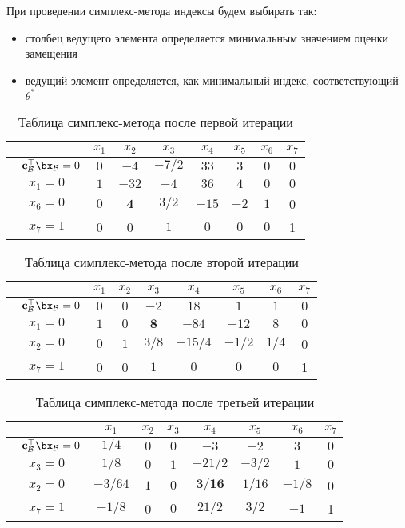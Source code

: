\documentclass[12pt]{article}
\begin{document}
При проведении симплекс-метода индексы будем выбирать так:
\begin{itemize}
\item столбец ведущего элемента определяется минимальным значением оценки замещения
\item ведущий элемент определяется, как минимальный индекс, соответствующий $\theta^*$
\end{itemize}

\newpage

\begin{table}[!ht]
\centering
\caption{Таблица симплекс-метода после первой итерации}
\begin{tabular}{|c|ccccccc|}
\hline
& $x_1$ & $x_2$ & $x_3$ & $x_4$ & $x_5$ & $x_6$ & $x_7$\\
\hline
$-\mathbf{c}_{\mathcal{B}}^{\top}\bx_{\mathcal{B}} = 0$ & $0$ & $-4$ & $-7/2$ & $33$ & $3$ & $0$ & $0$ \\
\hline
$x_1 = 0$ & $1$ & $-32$ & $-4$ & $36$ & $4$ & $0$ & $0$ \\
$x_6 = 0$ & $0$ & $\mathbf{4}$ & $3/2$ & $-15$ & $-2$ & $1$ & 0 \\
$x_7 = 1$ & 0 & 0 & $1$ & $0$ & $0$ & $0$ & 1 \\
\hline
\end{tabular}
\label{tab::simplex_21}
\end{table}

\begin{table}[!ht]
\centering
\caption{Таблица симплекс-метода после второй итерации}
\begin{tabular}{|c|ccccccc|}
\hline
& $x_1$ & $x_2$ & $x_3$ & $x_4$ & $x_5$ & $x_6$ & $x_7$\\
\hline
$-\mathbf{c}_{\mathcal{B}}^{\top}\bx_{\mathcal{B}} = 0$ & $0$ & $0$ & $-2$ & $18$ & $1$ & $1$ & $0$ \\
\hline
$x_1 = 0$ & $1$ & $0$ & $\mathbf{8}$ & $-84$ & $-12$ & $8$ & $0$ \\
$x_2 = 0$ & $0$ & $1$ & $3/8$ & $-15/4$ & $-1/2$ & $1/4$ & 0 \\
$x_7 = 1$ & 0 & 0 & $1$ & $0$ & $0$ & $0$ & 1 \\
\hline
\end{tabular}
\label{tab::simplex_22}
\end{table}

\begin{table}[!ht]
\centering
\caption{Таблица симплекс-метода после третьей итерации}
\begin{tabular}{|c|ccccccc|}
\hline
& $x_1$ & $x_2$ & $x_3$ & $x_4$ & $x_5$ & $x_6$ & $x_7$\\
\hline
$-\mathbf{c}_{\mathcal{B}}^{\top}\bx_{\mathcal{B}} = 0$ & $1/4$ & $0$ & $0$ & $-3$ & $-2$ & $3$ & $0$ \\
\hline
$x_3 = 0$ & $1/8$ & $0$ & $1$ & $-21/2$ & $-3/2$ & $1$ & $0$ \\
$x_2 = 0$ & $-3/64$ & $1$ & $0$ & $\mathbf{3/16}$ & $1/16$ & $-1/8$ & 0 \\
$x_7 = 1$ & $-1/8$ & 0 & $0$ & $21/2$ & $3/2$ & $-1$ & 1 \\
\hline
\end{tabular}
\label{tab::simplex_23}
\end{table}
\end{document}
